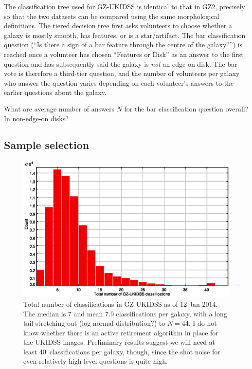 \documentclass[useAMS,usenatbib]{mn2e}
\begin{document}
The classification tree used for GZ-UKIDSS is identical to that in GZ2, precisely so that the two datasets can be compared using the same morphological definitions. The tiered decision tree \citep{wil13} first asks volunteers to choose whether a galaxy is mostly smooth, has features, or is a star/artifact. The bar classification question (``Is there a sign of a bar feature through the centre of the galaxy?'') is reached once a volunteer has chosen ``Features or Disk'' as an answer to the first question and has subsequently said the galaxy is \emph{not} an edge-on disk. The bar vote is therefore a third-tier question, and the number of volunteers per galaxy who answer the question varies depending on each volunteer's answers to the earlier questions about the galaxy.

What are average number of answers $N$ for the bar classification question overall? In non-edge-on disks?

\subsection{Sample selection}\label{sec:sample}

\begin{figure}
\includegraphics[scale=1.0]{figures/ukidss_count.eps}
\caption{
    Total number of classifications in GZ-UKIDSS as of 12-Jan-2014. The median is 7 and mean 7.9 classifications per galaxy, with a long tail stretching out (log-normal distribution?) to $N=44$. I do not know whether there is an active retirement algorithm in place for the UKIDSS images. Preliminary results suggest we will need at least 40~classifications per galaxy, though, since the shot noise for even relatively high-level questions is quite high. 
}
\label{fig:ukidss_count}
\end{figure}
\end{document}
